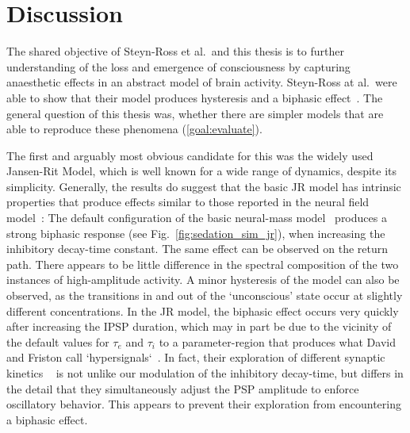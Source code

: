 \chapter{Discussion}

The shared objective of Steyn-Ross et al.\ and this thesis
is to further understanding of the loss and emergence of consciousness
by capturing anaesthetic effects in an abstract model of brain activity.
Steyn-Ross at al.\ were able to show
that their model produces hysteresis and a biphasic effect~\cite{hutt_progress_2011}.
The general question of this thesis was,
whether there are simpler models
that are able to reproduce these phenomena (\ref{goal:evaluate}).

The first and arguably most obvious candidate for this was the widely used Jansen-Rit Model,
which is well known for a wide range of dynamics, despite its simplicity.
Generally, the results do suggest that the basic JR model has intrinsic properties that produce
effects similar to those reported in the neural field model~\cite{hutt_progress_2011}:
The default configuration of the basic neural-mass model~\cite{jansen_electroencephalogram_1995}
produces a strong biphasic response (see Fig.~\ref{fig:sedation_sim_jr}),
when increasing the inhibitory decay-time constant.
The same effect can be observed on the return path.
There appears to be little difference in the spectral composition of the two instances of high-amplitude activity.
A minor hysteresis of the model can also be observed, as the transitions in and out of the `unconscious' state
occur at slightly different concentrations.
In the JR model, the biphasic effect occurs very quickly after increasing the IPSP duration, which may in part be due
to the vicinity of the default values for $\tau_e$ and $\tau_i$ to a parameter-region that produces what David and Friston call
`hypersignals`~\cite{david_neural_2003}.
In fact, their exploration of different synaptic kinetics ~\cite[Fig. 4]{david_neural_2003}
is not unlike our modulation of the inhibitory decay-time,
but differs in the detail that they simultaneously adjust the PSP amplitude to enforce oscillatory behavior.
This appears to prevent their exploration from encountering a biphasic effect.

